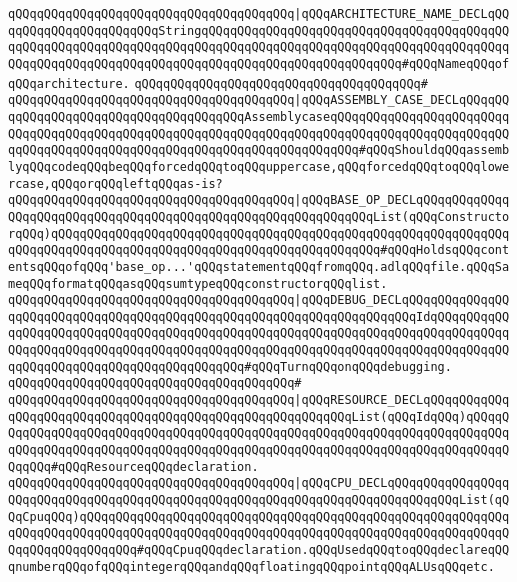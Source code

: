 \verb|qQQqqQQqqQQqqQQqqQQqqQQqqQQqqQQqqQQqqQQq|\verb#|qQQqARCHITECTURE_NAME_DECLqQQqqQQqqQQqqQQqqQQqqQQqStringqQQqqQQqqQQqqQQqqQQqqQQqqQQqqQQqqQQqqQQqqQQqqQQqqQQqqQQqqQQqqQQqqQQqqQQqqQQqqQQqqQQqqQQqqQQqqQQqqQQqqQQqqQQqqQQqqQQqqQQqqQQqqQQqqQQqqQQqqQQqqQQqqQQqqQQqqQQqqQQqqQQqqQQq#\verb|#qQQqNameqQQqofqQQqarchitecture.|\newline
\verb|qQQqqQQqqQQqqQQqqQQqqQQqqQQqqQQqqQQqqQQq#|\newline
\verb|qQQqqQQqqQQqqQQqqQQqqQQqqQQqqQQqqQQqqQQq|\verb#|qQQqASSEMBLY_CASE_DECLqQQqqQQqqQQqqQQqqQQqqQQqqQQqqQQqqQQqqQQqAssemblycaseqQQqqQQqqQQqqQQqqQQqqQQqqQQqqQQqqQQqqQQqqQQqqQQqqQQqqQQqqQQqqQQqqQQqqQQqqQQqqQQqqQQqqQQqqQQqqQQqqQQqqQQqqQQqqQQqqQQqqQQqqQQqqQQqqQQqqQQqqQQqqQQq#\verb|#qQQqShouldqQQqassemblyqQQqcodeqQQqbeqQQqforcedqQQqtoqQQquppercase,qQQqforcedqQQqtoqQQqlowercase,qQQqorqQQqleftqQQqas-is?|\newline
\verb|qQQqqQQqqQQqqQQqqQQqqQQqqQQqqQQqqQQqqQQq|\verb#|qQQqBASE_OP_DECLqQQqqQQqqQQqqQQqqQQqqQQqqQQqqQQqqQQqqQQqqQQqqQQqqQQqqQQqqQQqqQQqList(qQQqConstructorqQQq)qQQqqQQqqQQqqQQqqQQqqQQqqQQqqQQqqQQqqQQqqQQqqQQqqQQqqQQqqQQqqQQqqQQqqQQqqQQqqQQqqQQqqQQqqQQqqQQqqQQqqQQqqQQqqQQqqQQq#\verb|#qQQqHoldsqQQqcontentsqQQqofqQQq'base_op...'qQQqstatementqQQqfromqQQq.adlqQQqfile.qQQqSameqQQqformatqQQqasqQQqsumtypeqQQqconstructorqQQqlist.|\newline
\verb|qQQqqQQqqQQqqQQqqQQqqQQqqQQqqQQqqQQqqQQq|\verb#|qQQqDEBUG_DECLqQQqqQQqqQQqqQQqqQQqqQQqqQQqqQQqqQQqqQQqqQQqqQQqqQQqqQQqqQQqqQQqqQQqqQQqIdqQQqqQQqqQQqqQQqqQQqqQQqqQQqqQQqqQQqqQQqqQQqqQQqqQQqqQQqqQQqqQQqqQQqqQQqqQQqqQQqqQQqqQQqqQQqqQQqqQQqqQQqqQQqqQQqqQQqqQQqqQQqqQQqqQQqqQQqqQQqqQQqqQQqqQQqqQQqqQQqqQQqqQQqqQQqqQQqqQQqqQQq#\verb|#qQQqTurnqQQqonqQQqdebugging.|\newline
\verb|qQQqqQQqqQQqqQQqqQQqqQQqqQQqqQQqqQQqqQQq#|\newline
\verb|qQQqqQQqqQQqqQQqqQQqqQQqqQQqqQQqqQQqqQQq|\verb#|qQQqRESOURCE_DECLqQQqqQQqqQQqqQQqqQQqqQQqqQQqqQQqqQQqqQQqqQQqqQQqqQQqqQQqqQQqList(qQQqIdqQQq)qQQqqQQqqQQqqQQqqQQqqQQqqQQqqQQqqQQqqQQqqQQqqQQqqQQqqQQqqQQqqQQqqQQqqQQqqQQqqQQqqQQqqQQqqQQqqQQqqQQqqQQqqQQqqQQqqQQqqQQqqQQqqQQqqQQqqQQqqQQqqQQqqQQqqQQq#\verb|#qQQqResourceqQQqdeclaration.|\newline
\verb|qQQqqQQqqQQqqQQqqQQqqQQqqQQqqQQqqQQqqQQq|\verb#|qQQqCPU_DECLqQQqqQQqqQQqqQQqqQQqqQQqqQQqqQQqqQQqqQQqqQQqqQQqqQQqqQQqqQQqqQQqqQQqqQQqqQQqqQQqList(qQQqCpuqQQq)qQQqqQQqqQQqqQQqqQQqqQQqqQQqqQQqqQQqqQQqqQQqqQQqqQQqqQQqqQQqqQQqqQQqqQQqqQQqqQQqqQQqqQQqqQQqqQQqqQQqqQQqqQQqqQQqqQQqqQQqqQQqqQQqqQQqqQQqqQQqqQQqqQQq#\verb|#qQQqCpuqQQqdeclaration.qQQqUsedqQQqtoqQQqdeclareqQQqnumberqQQqofqQQqintegerqQQqandqQQqfloatingqQQqpointqQQqALUsqQQqetc.|\newline
